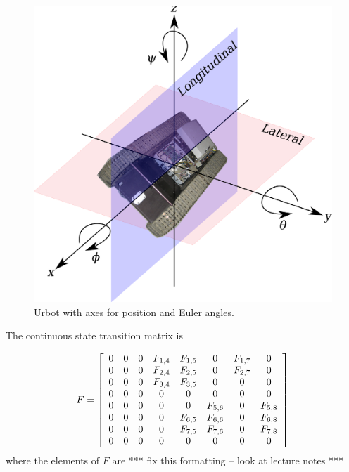 \begin{figure}[ht!]
	\centering
	\includegraphics[width=.75\textwidth]{images/urbotaxes}
	\caption{Urbot with axes for position and Euler angles.}
	\label{fig:urbotaxes}
\end{figure}

The continuous state transition matrix is

\begin{align}
\label{eq:kfF}
F = \left[\begin{array}{c c c c c c c c}
0 & 0 & 0 & F_{1,4} & F_{1,5} & 0 & F_{1,7} & 0 \\
0 & 0 & 0 & F_{2,4} & F_{2,5} & 0 & F_{2,7} & 0 \\
0 & 0 & 0 & F_{3,4} & F_{3,5} & 0 & 0 & 0 \\
0 & 0 & 0 & 0 & 0 & 0 & 0 & 0 \\
0 & 0 & 0 & 0 & 0 & F_{5,6} & 0 & F_{5,8} \\
0 & 0 & 0 & 0 & F_{6,5} & F_{6,6} & 0 & F_{6,8} \\
0 & 0 & 0 & 0 & F_{7,5} & F_{7,6} & 0 & F_{7,8} \\
0 & 0 & 0 & 0 & 0 & 0 & 0 & 0
\end{array}\right]
\end{align}
where the elements of $F$ are *** fix this formatting -- look at lecture notes ***

